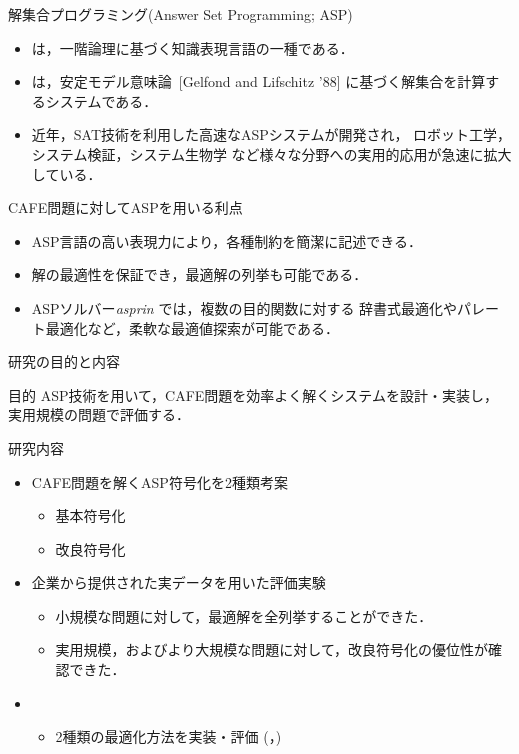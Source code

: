 \documentclass[dvipdfmx, 11pt]{beamer}
\begin{document}
\begin{frame}{解集合プログラミング(Answer Set Programming; ASP)}
 \begin{itemize}
 \item {}は，一階論理に基づく知識表現言語の一種である．
 \item {}は，安定モデル意味論~[Gelfond and Lifschitz '88]
   に基づく解集合を計算するシステムである．
 \item 近年，SAT技術を利用した高速なASPシステムが開発され，
   ロボット工学，システム検証，システム生物学
   など様々な分野への実用的応用が急速に拡大している．
 \end{itemize}
\vfill
 \begin{alertblock}{CAFE問題に対してASPを用いる利点}
   \begin{itemize} 
    \item ASP言語の高い表現力により，各種制約を簡潔に記述できる．
    \item 解の最適性を保証でき，最適解の列挙も可能である．
    \item ASPソルバー{\it asprin} では，複数の目的関数に対する
	  辞書式最適化やパレート最適化など，柔軟な最適値探索が可能である．
   \end{itemize}
 \end{alertblock}
\end{frame}
\begin{frame}{研究の目的と内容}
  \begin{alertblock}{目的}
    ASP技術を用いて，CAFE問題を効率よく解くシステムを設計・実装し，
    実用規模の問題で評価する．
  \end{alertblock}
\begin{block}{研究内容}
 \begin{itemize}
  \item CAFE問題を解くASP符号化を2種類考案
	\begin{itemize}
	 \item 基本符号化
	 \item 改良符号化
	\end{itemize}
  \item 企業から提供された実データを用いた評価実験
	\begin{itemize}
	 \item 小規模な問題に対して，最適解を全列挙することができた．
	 \item 実用規模，およびより大規模な問題に対して，改良符号化の優位性が確認できた．
	\end{itemize}
  \item {}
	\begin{itemize}
	 \item 2種類の最適化方法を実装・評価
	       (，)
	\end{itemize}
 \end{itemize}
\end{block}  
\end{frame}
\end{document}
